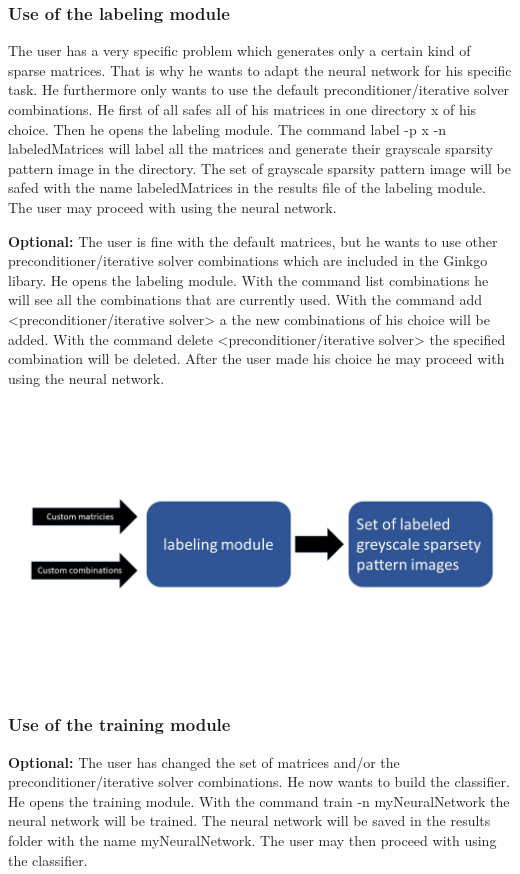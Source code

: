 \documentclass[parskip=full]{scrartcl}
\begin{document}
\subsubsection{Use of the \gls{labeling module}}
The user has a very specific problem which generates only a certain kind of sparse matrices. That is why he wants to adapt the \gls{neural network} for his specific task. He furthermore only wants to use the default \gls{preconditioner}/\gls{iterative solver} combinations. He first of all safes all of his matrices in one directory x of his choice. Then he opens the \gls{labeling module}. The command label -p x -n labeledMatrices will label all the matrices and generate their \gls{grayscale sparsity pattern image} in the directory. The set of \gls{grayscale sparsity pattern image} will be safed with the name labeledMatrices in the results file of the \gls{labeling module}. The user may proceed with using the \gls{neural network}.


\textbf{Optional:} The user is fine with the default matrices, but he wants to use other \gls{preconditioner}/\gls{iterative solver} combinations which are included in the \gls{Ginkgo} libary. He opens the \gls{labeling module}. With the command list combinations he will see all the combinations that are currently used. With the command add <\gls{preconditioner}/\gls{iterative solver}> a the new combinations of his choice will be added. With the command delete <\gls{preconditioner}/\gls{iterative solver}> the specified combination will be deleted. After the user made his choice he may proceed with using the \gls{neural network}.
\begin{center}
\includegraphics[width=\textwidth]{labelingModule}
\end{center}


\subsubsection{Use of the \gls{training module}}
\textbf{Optional:} The user has changed the set of matrices and/or the \gls{preconditioner}/\gls{iterative solver} combinations. He now wants to build the \gls{classifier}. He opens the \gls{training module}. With the command train -n myNeuralNetwork the \gls{neural network} will be trained. The \gls{neural network} will be saved in the results folder with the name myNeuralNetwork.  The user may then proceed with using the \gls{classifier}.
\end{document}
